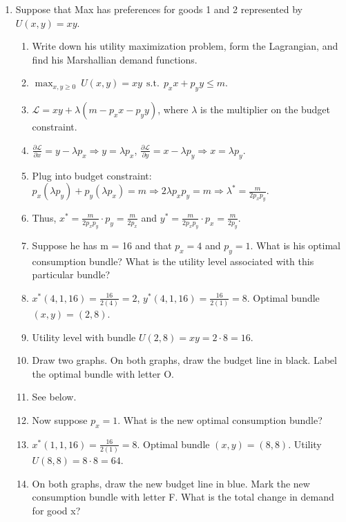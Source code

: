 \documentclass{article}
\begin{document}
\begin{enumerate}
\begin{enumerate}[label=(\alph*)]
\item[] Solving for $p_x$: $p_x=2(400-\frac{1}{2}p_x) \Rightarrow p_x=800-p_x \Rightarrow2p_x=800 \Rightarrow p_x=400$.
\item[] Solving for $x$: $x=400-\frac{1}{2}(400)=200$.
\item[] Thus, demand is unit elastic at $(p_x,x)=(400,200)$.
\end{enumerate}
\item Suppose that Max has preferences for goods 1 and 2 represented by $U(x,y) = xy.$
\begin{enumerate}[label=(\alph*)]
\item Write down his utility maximization problem, form the Lagrangian, and find his Marshallian demand functions.
\item[] $\max_{x,y\geq 0} \ U(x,y)=xy \ \ \text{s.t.} \ \ p_xx+p_yy\leq m$.
\item[] $\mathcal{L}=xy+\lambda(m-p_xx-p_yy)$, where $\lambda$ is the multiplier on the budget constraint.
\item[] $\frac{\partial \mathcal{L}}{\partial x}=y-\lambda p_x \Rightarrow y=\lambda p_x$, $\frac{\partial \mathcal{L}}{\partial y}=x-\lambda p_y \Rightarrow x=\lambda p_y$.
\item[] Plug into budget constraint: $p_x(\lambda p_y)+p_y(\lambda p_x)=m \Rightarrow2\lambda p_xp_y=m \Rightarrow \lambda ^*=\frac{m}{2p_xp_y}$.
\item[] Thus, $x^*=\frac{m}{2p_xp_y}\cdot p_y=\frac{m}{2p_x}$ and $y^*=\frac{m}{2p_xp_y}\cdotp p_x=\frac{m}{2p_y}$.
\item Suppose he has m = 16 and that $p_x = 4$ and $p_y = 1$. What is his optimal consumption bundle? What is the utility level associated with this particular bundle?
\item[] $x^*(4,1,16)=\frac{16}{2(4)}=2$, $y^*(4,1,16)=\frac{16}{2(1)}=8$. Optimal bundle $(x,y)=(2,8)$.
\item[] Utility level with bundle $U(2,8)=xy=2\cdot8=16$.
\item Draw two graphs. On both graphs, draw the budget line in black. Label the optimal bundle with letter O.
\item[] See below.
\item Now suppose $p_x = 1$. What is the new optimal consumption bundle? 
\item[] $x^*(1,1,16)=\frac{16}{2(1)}=8$. Optimal bundle $(x,y)=(8,8)$. Utility $U(8,8)=8\cdot8=64$.
\item On both graphs, draw the new budget line in blue. Mark the new consumption bundle with letter F. What is the total change in demand for good x?

\end{enumerate}
\end{enumerate}
\end{document}
